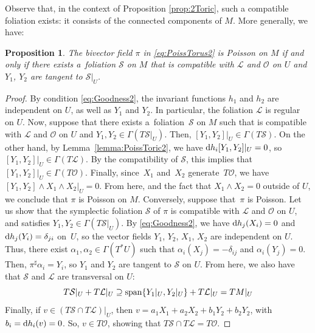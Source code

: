 \documentclass[10pt,a4paper]{amsart}
\newcommand{\dd}{{\rm d}}
\numberwithin{equation}{section}
\newtheorem{Proposition}[Theorem]{Proposition}
 { \theoremstyle{definition}
\newtheorem{Definition}[Theorem]{Definition}
\newtheorem{Note}[Theorem]{Note}
\newtheorem{Example}[Theorem]{Example}
\newtheorem{Remark}[Theorem]{Remark} }
\begin{document}
Observe that, in the context of Proposition \ref{prop:2Toric}, such a compatible foliation exists: it consists of the connected components of $M$. More generally, we have:

\begin{Proposition}\label{prop:PoissTorus}
The bivector field $\pi$ in \eqref{eq:PoissTorus2} is Poisson on $M$ if and only if there exists a~foli\-a\-tion $\mathcal{S}$ on $M$ that is compatible with $\mathcal{L}$ and $\mathcal{O}$ on $U$ and $Y_1$, $Y_2$ are tangent to $\mathcal{S}|_{U}$.
\end{Proposition}
\begin{proof}
By condition \eqref{eq:Goodness2}, the invariant functions $h_1$ and $h_2$ are independent on $U$, as well as $Y_1$ and $Y_2$. In particular, the foliation $\mathcal{L}$ is regular on $U$. Now, suppose that there exists a~foliation~$\mathcal{S}$ on $M$ such that is compatible with $\mathcal{L}$ and $\mathcal{O}$ on $U$ and $Y_1,Y_2 \in \Gamma(T\mathcal{S}|_{U})$. Then, $[Y_1,Y_2]|_{U} \in \Gamma(T\mathcal{S})$. On the other hand, by Lemma~\ref{lemma:PoissToric2}, we have $\dd h_{i}[Y_1,Y_2]|_{U} = 0$, so $[Y_1,Y_2]|_{U} \in \Gamma(T\mathcal{L})$. By the compatibility of $\mathcal{S}$, this implies that $[Y_1,Y_2]|_{U} \in \Gamma(T\mathcal{O})$. Finally, since~$X_1$ and~$X_2$ generate~$T\mathcal{O}$, we have $[Y_1,Y_2] \wedge X_1 \wedge X_2|_{U} = 0$. From here, and the fact that $X_1 \wedge X_2 = 0$ outside of $U$, we conclude that $\pi$ is Poisson on $M$. Conversely, suppose that~$\pi$ is Poisson. Let us show that the symplectic foliation $\mathcal{S}$ of $\pi$ is compatible with $\mathcal{L}$ and $\mathcal{O}$ on $U$, and satisfies $Y_1,Y_2 \in \Gamma(T\mathcal{S}|_{U})$. By \eqref{eq:Goodness2}, we have $\dd h_{j}(X_i) = 0$ and $\dd h_{j}(Y_i) = \delta_{ji}$ on~$U$, so the vector fields $Y_1$, $Y_2$, $X_1$, $X_2$ are independent on $U$. Thus, there exist $\alpha_1,\alpha_2 \in \Gamma(T^{*}U)$ such that $\alpha_{i}(X_{j}) = -\delta_{ij}$ and $\alpha_{i}(Y_{j}) = 0$. Then, $\pi^{\sharp}\alpha_{i} = Y_{i}$, so $Y_1$ and $Y_2$ are tangent to $\mathcal{S}$ on $U$. From here, we also have that $\mathcal{S}$ and $\mathcal{L}$ are transversal on $U$:
 \begin{equation*}
 T\mathcal{S}|_{U}+T\mathcal{L}|_{U} \supseteq {\rm span}\{Y_1|_{U},Y_2|_{U}\} + T\mathcal{L}|_{U} = TM|_{U}
 \end{equation*}
Finally, if $v \in (T\mathcal{S} \cap T\mathcal{L})|_U$, then $v = a_1 X_1+a_2X_2 + b_1Y_2+b_2Y_2$, with $b_{i} = \dd h_{i}(v) = 0$. So, $v \in T\mathcal{O}$, showing that $T\mathcal{S} \cap T\mathcal{L}=T\mathcal{O}$.
\end{proof}
\end{document}
